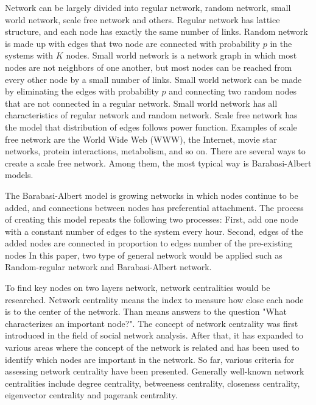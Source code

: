 Network can be largely divided into regular network, random network\cite{erdos1960}, small world network\cite{watts1998}, scale free network\cite{barabasi1999} and others. 
Regular network has lattice structure, and  each node has exactly the same number of links.
Random network is made up with edges that two node are connected with probability $p$ in the systems with $K$ nodes. 
Small world network is a network graph in which most nodes are not neighbors of one another, but most nodes can be reached from every other node by a small number of links. Small world network can be made by eliminating the edges with probability $p$ and connecting two random nodes that are not connected in a regular network. Small world network has all characteristics of regular network and random network.
Scale free network has the model that distribution of edges follows power function. Examples of scale free network are the World Wide Web (WWW), the Internet, movie star networks, protein interactions, metabolism, and so on.
There are several ways to create a scale free network. Among them,  the most typical way is Barabasi-Albert models.


The Barabasi-Albert model is growing networks in which nodes continue to be added, and connections between nodes has preferential attachment. The process of creating this model repeats the following two processes: First, add one node with a constant number of edges to the system every hour. Second, edges of the added nodes are connected in proportion to edges number of the pre-existing nodes
In this paper, two type of general network would be applied such as Random-regular network and Barabasi-Albert network.


To find key nodes on two layers network, network centralities would be researched.
Network centrality means the index to measure how close each node is to the center of the network. Than means answers to the question "What characterizes an important node?". The concept of network centrality was first introduced in the field of social network analysis.\cite{freeman1979} After that, it has expanded to various areas where the concept of the network is related and has been used to identify which nodes are important in the network. So far, various criteria for assessing network centrality have been presented. Generally well-known network centralities include degree centrality, betweeness centrality, closeness centrality, eigenvector centrality and pagerank centrality.\cite{koschutzki2008}

